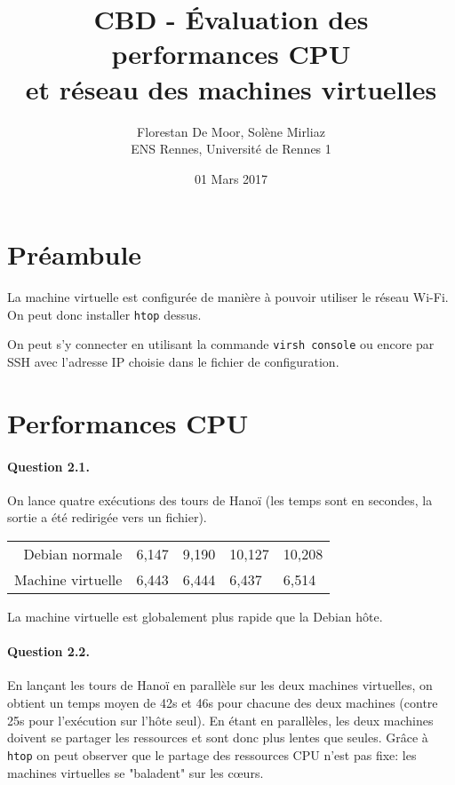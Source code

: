 \documentclass[a4paper]{article}
\begin{document}
\title{CBD - Évaluation des performances CPU\\ et réseau des machines virtuelles}
\author{Florestan De Moor, Solène Mirliaz\\ ENS Rennes, Université de Rennes 1}
\date{01 Mars 2017}

\maketitle

\section{Préambule}

La machine virtuelle est configurée de manière à pouvoir utiliser le réseau Wi-Fi.
On peut donc installer \texttt{htop} dessus.

On peut s'y connecter en utilisant la commande \texttt{virsh console} ou encore par SSH avec l'adresse IP choisie dans le fichier de configuration.

\section{Performances CPU}

\paragraph{Question 2.1.} On lance quatre exécutions des tours de Hanoï (les temps sont en secondes, la sortie a été redirigée vers un fichier).
\begin{center}
\begin{tabular}{r|l l l l}
Debian normale & 6,147 & 9,190 & 10,127 & 10,208 \\
Machine virtuelle & 6,443 & 6,444 & 6,437 & 6,514
\end{tabular}
\end{center}
La machine virtuelle est globalement plus rapide que la Debian hôte.

\paragraph{Question 2.2.} En lançant les tours de Hanoï en parallèle sur les deux machines virtuelles, on obtient un temps moyen de 42s et 46s pour chacune des deux machines (contre 25s pour l'exécution sur l'hôte seul). En étant en parallèles, les deux machines doivent se partager les ressources et sont donc plus lentes que seules. Grâce à \texttt{htop} on peut observer que le partage des ressources CPU n'est pas fixe: les machines virtuelles se "baladent" sur les cœurs.
\end{document}

